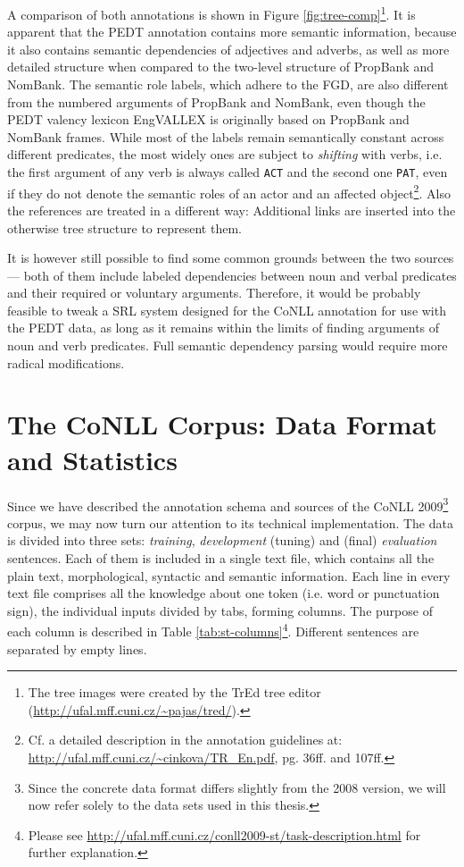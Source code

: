 \documentclass[12pt,notitlepage]{report}
\begin{document}
A comparison of both annotations is shown in Figure \ref{fig:tree-comp}\footnote{The tree images were created by the TrEd tree editor\\(\url{http://ufal.mff.cuni.cz/\~pajas/tred/}).}. It is apparent that the PEDT annotation contains more semantic information, because it also contains semantic dependencies of adjectives and adverbs, as well as more detailed structure when compared to the two-level structure of PropBank and NomBank. The semantic role labels, which adhere to the FGD, are also different from the numbered arguments of PropBank and NomBank, even though the PEDT valency lexicon EngVALLEX \citep{semecky06} is originally based on PropBank and NomBank frames. While most of the labels remain semantically constant across different predicates, the most widely ones are subject to \emph{shifting} with verbs, i.e. the first argument of any verb is always called \texttt{ACT} and the second one \texttt{PAT}, even if they do not denote the semantic roles of an actor and an affected object\footnote{Cf. a detailed description in the annotation guidelines at: \\ \url{http://ufal.mff.cuni.cz/\~cinkova/TR\_En.pdf}, pg. 36ff. and 107ff.}. Also the references are treated in a different way: Additional links are inserted into the otherwise tree structure to represent them.

It is however still possible to find some common grounds between the two sources --- both of them include labeled dependencies between noun and verbal predicates and their required or voluntary arguments. Therefore, it would be probably feasible to tweak a SRL system designed for the CoNLL annotation for use with the PEDT data, as long as it remains within the limits of finding arguments of noun and verb predicates. Full semantic dependency parsing would require more radical modifications.

\section{The CoNLL Corpus: Data Format and Statistics}

Since we have described the annotation schema and sources of the CoNLL 2009\footnote{Since the concrete data format differs slightly from the 2008 version, we will now refer solely to the data sets used in this thesis.} corpus, we may now turn our attention to its technical implementation. The data is divided into three sets: \emph{training}, \emph{development} (tuning) and (final) \emph{evaluation} sentences. Each of them is included in a single text file, which contains all the plain text, morphological, syntactic and semantic information. Each line in every text file comprises all the knowledge about one token (i.e. word or punctuation sign), the individual inputs divided by tabs, forming columns. The purpose of each column is described in Table \ref{tab:st-columns}\footnote{Please see \url{http://ufal.mff.cuni.cz/conll2009-st/task-description.html} for further explanation.}. Different sentences are separated by empty lines.
\end{document}
